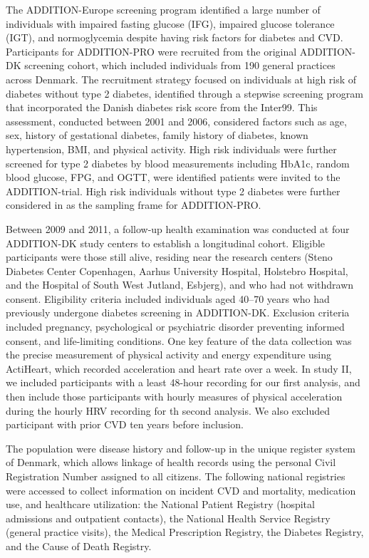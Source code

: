 \documentclass[
  a4paper,
  headsepline=true,
  open=any]{scrbook}
\begin{document}
The ADDITION-Europe screening program identified a large number of
individuals with impaired fasting glucose (IFG), impaired glucose
tolerance (IGT), and normoglycemia despite having risk factors for
diabetes and CVD. Participants for ADDITION-PRO were recruited from the
original ADDITION-DK screening cohort, which included individuals from
190 general practices across Denmark. The recruitment strategy focused
on individuals at high risk of diabetes without type 2 diabetes,
identified through a stepwise screening program that incorporated the
Danish diabetes risk score from the Inter99. This assessment, conducted
between 2001 and 2006, considered factors such as age, sex, history of
gestational diabetes, family history of diabetes, known hypertension,
BMI, and physical activity. High risk individuals were further screened
for type 2 diabetes by blood measurements including HbA1c, random blood
glucose, FPG, and OGTT, were identified patients were invited to the
ADDITION-trial. High risk individuals without type 2 diabetes were
further considered in as the sampling frame for ADDITION-PRO.

Between 2009 and 2011, a follow-up health examination was conducted at
four ADDITION-DK study centers to establish a longitudinal cohort.
Eligible participants were those still alive, residing near the research
centers (Steno Diabetes Center Copenhagen, Aarhus University Hospital,
Holstebro Hospital, and the Hospital of South West Jutland, Esbjerg),
and who had not withdrawn consent. Eligibility criteria included
individuals aged 40--70 years who had previously undergone diabetes
screening in ADDITION-DK. Exclusion criteria included pregnancy,
psychological or psychiatric disorder preventing informed consent, and
life-limiting conditions. One key feature of the data collection was the
precise measurement of physical activity and energy expenditure using
ActiHeart, which recorded acceleration and heart rate over a week. In
study II, we included participants with a least 48-hour recording for
our first analysis, and then include those participants with hourly
measures of physical acceleration during the hourly HRV recording for th
second analysis. We also excluded participant with prior CVD ten years
before inclusion.

The population were disease history and follow-up in the unique register
system of Denmark, which allows linkage of health records using the
personal Civil Registration Number assigned to all citizens. The
following national registries were accessed to collect information on
incident CVD and mortality, medication use, and healthcare utilization:
the National Patient Registry (hospital admissions and outpatient
contacts), the National Health Service Registry (general practice
visits), the Medical Prescription Registry, the Diabetes Registry, and
the Cause of Death Registry.
\end{document}
